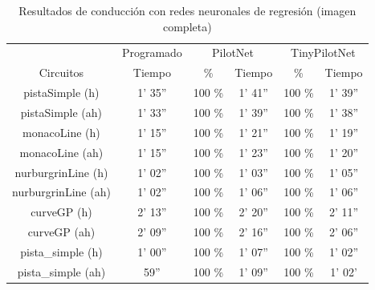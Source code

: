 \begin{table}[H]
\centering
\caption{Resultados de conducción con redes neuronales de regresión (imagen completa)}
\label{resultados_regresion_completa}
\begin{tabular}{c|c|c|c|c|c|}
\cline{2-6}
                          & \multicolumn{1}{c|}{Programado} & \multicolumn{2}{c|}{PilotNet} & \multicolumn{2}{c|}{TinyPilotNet} \\ \cline{1-6} 
                        \multicolumn{1}{|c|}{Circuitos}    & Tiempo       & \%       & Tiempo       & \%        & Tiempo         \\ \hline
\multicolumn{1}{|c|}{pistaSimple (h)}    & 1' 35''           & 100 \%         & 1' 41''       &  100 \%        & 1' 39''               \\ \hline
\multicolumn{1}{|c|}{pistaSimple (ah)}     & 1' 33''           & 100 \%          & 1' 39''           & 100 \%        & 1' 38''      \\ \hline
\multicolumn{1}{|c|}{monacoLine (h)}      & 1' 15''           & 100 \%            & 1' 21''            & 100 \%         & 1' 19''                \\ \hline
\multicolumn{1}{|c|}{monacoLine (ah)}       & 1' 15''       &  100 \%      & 1' 23''         & 100 \%          & 1' 20''         \\ \hline
\multicolumn{1}{|c|}{nurburgrinLine (h)}      & 1' 02''       &  100 \%         & 1' 03''           & 100 \%        & 1' 05''       \\ \hline
\multicolumn{1}{|c|}{nurburgrinLine (ah)}       & 1' 02''     & 100 \%         & 1' 06''          & 100 \%     & 1' 06''            \\ \hline
\multicolumn{1}{|c|}{curveGP (h)}     & 2' 13''           & 100 \%         & 2' 20''            & 100 \%        & 2' 11''             \\ \hline
\multicolumn{1}{|c|}{curveGP (ah)}       & 2' 09''            & 100 \%         & 2' 16''        & 100 \%        & 2' 06''        \\ \hline
\multicolumn{1}{|c|}{pista\_simple (h)}       & 1' 00''           & 100 \%       & 1' 07''            & 100 \%         & 1' 02''        \\ \hline
\multicolumn{1}{|c|}{pista\_simple (ah)}     & 59''          & 100 \%       & 1' 09''         & 100 \%        & 1' 02'                 \\ \hline
\end{tabular}
\end{table}


